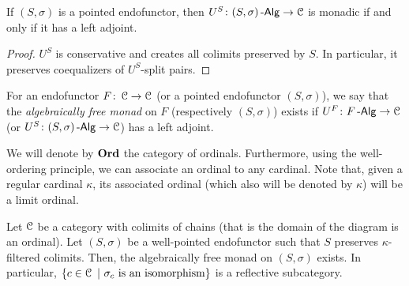 \documentclass[a4paper,11pt,oneside,openany]{scrbook}
\begin{document}
\begin{lemma}
	If $(S,\sigma)$ is a pointed endofunctor, then
    $U^S\colon(S,\sigma)\operatorname{-\mathsf{Alg}}\to\operatorname{\mathcal{C}}$ is monadic if and only if it has a left
    adjoint.
\end{lemma}
\begin{proof}
	$U^S$ is conservative and creates all colimits preserved by $S$. In
    particular, it preserves coequalizers of $U^S$-split pairs.
\end{proof}
\begin{defn}
	For an endofunctor $F\colon\operatorname{\mathcal{C}}\to\operatorname{\mathcal{C}}$ (or a pointed endofunctor $(S,\sigma)$),
    we say that the \emph{algebraically free monad} on $F$ (respectively
    $(S,\sigma)$) exists if $U^F\colon F\operatorname{-\mathsf{Alg}}\to\operatorname{\mathcal{C}}$ (or
    $U^S\colon(S,\sigma)\operatorname{-\mathsf{Alg}}\to\operatorname{\mathcal{C}}$) has a left adjoint.
\end{defn}

We will denote by $\operatorname{\mathbf{Ord}}$ the category of ordinals. Furthermore, using
the well-ordering principle, we can associate an ordinal to any cardinal.
Note that, given a regular cardinal $\kappa$, its associated ordinal
(which also will be denoted by $\kappa$) will be a limit ordinal.

\begin{thm}
	Let $\operatorname{\mathcal{C}}$ be a category with colimits of chains (that is the domain of the
    diagram is an ordinal). Let $(S,\sigma)$ be a well-pointed endofunctor such
    that $S$ preserves $\kappa$-filtered colimits. Then, the algebraically free
    monad on $(S,\sigma)$ exists. In particular, $\{c\in\C\ |\ \sigma_c\text{ is
    an isomorphism}\}$ is a reflective subcategory.
\end{thm}
\end{document}
